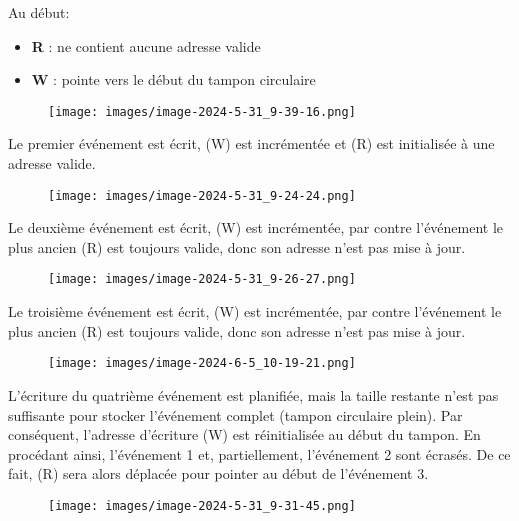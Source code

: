 \documentclass[a4paper, 12pt]{report}
\begin{document}
        Au début:
        \begin{itemize}
            \item \textbf{R} : ne contient aucune adresse valide
            \item  \textbf{W} : pointe vers le début du tampon circulaire
        \end{itemize}

        
        \begin{figure}[H]
            \centering
            \texttt{[image: images/image-2024-5-31\_9-39-16.png]}
        \end{figure}

        Le premier événement est écrit, (W) est incrémentée et (R) est initialisée à une adresse valide.
        
        \begin{figure}[H]
            \centering
            \texttt{[image: images/image-2024-5-31\_9-24-24.png]}
        \end{figure}
        Le deuxième événement est écrit, (W) est incrémentée, par contre l'événement le plus ancien (R) est toujours valide, donc son adresse n'est pas mise à jour.
         \begin{figure}[H]
            \centering
            \texttt{[image: images/image-2024-5-31\_9-26-27.png]}
        \end{figure}
        Le troisième événement est écrit, (W) est incrémentée, par contre l'événement le plus ancien (R) est toujours valide, donc son adresse n'est pas mise à jour.
         \begin{figure}[H]
            \centering
            \texttt{[image: images/image-2024-6-5\_10-19-21.png]}
        \end{figure}
        L'écriture du quatrième événement est planifiée, mais la taille restante n'est pas suffisante pour stocker l'événement complet (tampon circulaire plein). Par conséquent, l'adresse d'écriture (W) est réinitialisée au début du tampon. En procédant ainsi, l'événement 1 et, partiellement, l'événement 2 sont écrasés. De ce fait, (R) sera alors déplacée pour pointer au début de l'événement 3.

         \begin{figure}[H]
            \centering
            \texttt{[image: images/image-2024-5-31\_9-31-45.png]}
        \end{figure}


\end{document}
